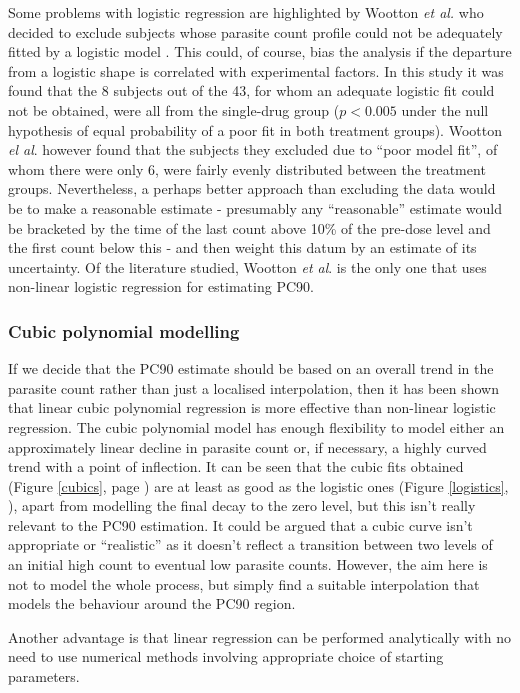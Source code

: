 Some problems with logistic regression are highlighted by Wootton {\it et al.}  who decided to exclude subjects whose parasite count profile could not be adequately fitted by a logistic model \cite{wootton}. This could, of course, bias the analysis if the departure from a logistic shape is correlated with experimental factors. In this study it was found that the 8 subjects out of the 43, for whom an adequate logistic fit could not be obtained, were all from the single-drug group ($p<0.005$ under the null hypothesis of equal probability  of a poor fit in both treatment groups). Wootton {\it el al}. however found that the subjects they excluded due to ``poor model fit'', of whom there were only 6, were fairly evenly distributed between the treatment groups. Nevertheless, a perhaps better approach than excluding the data would be to make a reasonable estimate - presumably any ``reasonable'' estimate would be bracketed by the time of the last count above 10\% of the pre-dose level and the first count below this - and then weight this datum by an estimate of its uncertainty. Of the literature studied, Wootton {\it et al}. is the only one that uses non-linear logistic regression for estimating PC90.

\subsubsection*{Cubic polynomial modelling}
If we decide that the PC90 estimate should be based on an overall trend in the parasite count rather than just a localised interpolation, then it has been shown that linear cubic polynomial regression is more effective than non-linear logistic regression. The cubic polynomial model has enough flexibility to model either an approximately linear decline in parasite count or, if necessary, a highly curved trend with a point of inflection. It can be seen that the cubic fits obtained (Figure \ref{cubics}, page \pageref{cubics}) are at least as good as the logistic ones (Figure \ref{logistics}, \pageref{logistics}), apart from modelling the final decay to the zero level, but this isn't really relevant to the PC90 estimation. It could be argued that a cubic curve isn't appropriate or ``realistic'' as it doesn't reflect a transition between two levels of an initial high count to eventual low parasite counts. However, the aim here is not to model the whole process, but simply find a suitable interpolation that models the behaviour around the PC90 region. 

Another advantage is that linear regression can be performed analytically with no need to use numerical methods involving appropriate choice of starting parameters.

